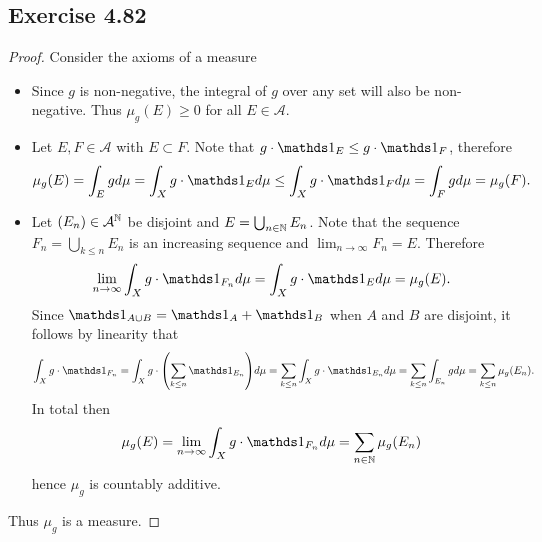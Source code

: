 \documentclass[hw_all.tex]{subfiles}
\begin{document}
\subsection{Exercise 4.82}

\begin{proof}
    Consider the axioms of a measure
    \begin{itemize}
        \item 
            Since $g$ is non-negative, the integral of $g$ over any set will also be non-negative. Thus $\mu_g(E) \geq 0$ for all $E \in \mathcal{A}$.

        \item 
            Let $E,F \in \mathcal{A}$ with $E \subset F$. Note that $g\cdot\ind{E} \leq g\cdot\ind{F}$, therefore
            \[
                \mu_g(E) = \int_E g d \mu = \int_X g \cdot \ind{E} d \mu \leq \int_X g \cdot \ind{F} d \mu = \int_F g d \mu = \mu_g(F)
            .\]

        \item 
            Let $(E_n) \in \mathcal{A}^{\mathbb{N}}$ be disjoint and $E = \bigcup_{n \in \mathbb{N}} E_n$. Note that the sequence $F_n = \bigcup_{k \leq n} E_n$ is an increasing sequence and $\lim_{n \to \infty} F_n = E$. Therefore
            \[
                \lim_{n \to \infty} \int_X g \cdot \ind{F_n} d \mu = \int_X g \cdot \ind{E} d \mu = \mu_g(E)
            .\]
            Since $\ind{A \cup B} = \ind{A} + \ind{B}$ when $A$ and $B$ are disjoint, it follows by linearity that
            \[
               \int_X g \cdot \ind{F_n} = \int_X g \cdot \qty(\sum_{k \leq n} \ind{E_n}) d \mu = \sum_{k \leq n} \int_X g \cdot \ind{E_n} d \mu = \sum_{k \leq n} \int_{E_n} g d \mu = \sum_{k \leq n} \mu_g(E_n)
            .\]
            In total then
            \[
                \mu_g(E) = \lim_{n \to \infty} \int_X g \cdot \ind{F_n} d \mu = \sum_{n \in \N} \mu_g(E_n)
            \]
            hence $\mu_g$ is countably additive.
    \end{itemize}
    Thus $\mu_g$ is a measure.
\end{proof}
\end{document}
